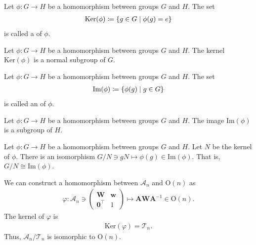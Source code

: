 \begin{screen}
  \begin{definition}[kernel]
    Let $\phi: G \to H$ be a homomorphism between groups $G$ and $H$.
    The set
    \begin{align}
      \mathrm{Ker}(\phi) \coloneqq \left\{  g \in G  \mathrel{}\middle|\mathrel{}  \phi(g) = e  \right\}
    \end{align}
    is called a  of $\phi$.
  \end{definition}
\end{screen}

\begin{screen}
  \begin{prop}
    Let $\phi: G \to H$ be a homomorphism between groups $G$ and $H$.
    The kernel $\mathrm{Ker}(\phi)$ is a normal subgroup of $G$.
  \end{prop}
\end{screen}

\begin{screen}
  \begin{definition}[image]
    Let $\phi: G \to H$ be a homomorphism between groups $G$ and $H$.
    The set
    \begin{align}
      \mathrm{Im}(\phi) \coloneqq \left\{  \phi(g)  \mathrel{}\middle|\mathrel{}  g \in G  \right\}
    \end{align}
    is called an  of $\phi$.
  \end{definition}
\end{screen}

\begin{screen}
  \begin{prop}
    Let $\phi: G \to H$ be a homomorphism between groups $G$ and $H$.
    The image $\mathrm{Im}(\phi)$ is a subgroup of $H$.
  \end{prop}
\end{screen}

\begin{screen}
  \begin{them}
    Let $\phi: G \to H$ be a homomorphism between groups $G$ and $H$.
    Let $N$ be the kernel of $\phi$.
    There is an isomorphism $G/N \ni gN \mapsto \phi(g) \in \mathrm{Im}(\phi)$.
    That is, $G/N \cong \mathrm{Im}(\phi)$.
  \end{them}
\end{screen}

We can construct a homomorphism between $\mathcal{A}_{n}$ and $\mathrm{O}(n)$ as
\begin{align*}
  \varphi: \mathcal{A}_{n} \ni \begin{pmatrix} \bm{W} & \bm{w} \\ \bm{0}^{\top} & 1 \end{pmatrix}
    \mapsto \bm{A} \bm{W} \bm{A}^{-1} \in \mathrm{O}(n).
\end{align*}
The kernel of $\varphi$ is
\begin{align*}
  \mathrm{Ker}(\varphi) = \mathcal{T}_{n}.
\end{align*}
Thus, $\mathcal{A}_{n} / \mathcal{T}_{n}$ is isomorphic to $\mathrm{O}(n)$.

